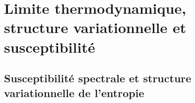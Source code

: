 %
%
%
%



\section{Limite thermodynamique, structure variationnelle et susceptibilité}

\subsection{Susceptibilité spectrale et structure variationnelle de l’entropie}

